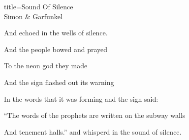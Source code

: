\begin{song}{title=\predtitle\centering Sound Of Silence \\\large Simon \& Garfunkel  \vspace*{-0.3cm}}
\begin{centerjustified}
   And echoed in the wells of silence. 
   
\sloka
   And the people bowed and prayed 
   
   To the neon god they made 
   
   And the sign flashed out its warning 
   
   In the words that it was forming and the sign said: 
   
   ``The words of the prophets are written on the subway walls 
   
    And tenement halls.'' and whisper\ap d in the sound of silence. 
   
\end{centerjustified}
\setcounter{Slokočet}{0}
\end{song}
